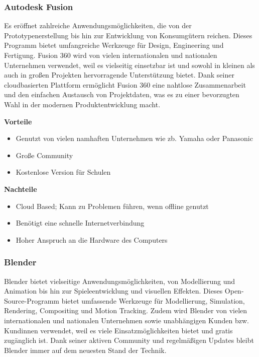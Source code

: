 \subsubsection{Autodesk Fusion}
Es eröffnet zahlreiche Anwendungsmöglichkeiten, die von der Prototypenerstellung bis hin zur Entwicklung von Konsumgütern reichen. Dieses Programm bietet umfangreiche Werkzeuge für Design, Engineering und Fertigung.  Fusion 360 wird von vielen internationalen und nationalen Unternehmen verwendet, weil es vielseitig einsetzbar ist und sowohl in kleinen als auch in großen Projekten hervorragende Unterstützung bietet. Dank seiner cloudbasierten Plattform ermöglicht Fusion 360 eine nahtlose Zusammenarbeit und den einfachen Austausch von Projektdaten, was es zu einer bevorzugten Wahl in der modernen Produktentwicklung macht. \\
\cite{AutodeskFusion}

\textbf{Vorteile}
\begin{itemize}
	\item Genutzt von vielen namhaften Unternehmen wie zb. Yamaha oder Panasonic
	\item Große Community
	\item Kostenlose Version für Schulen
\end{itemize} 

\textbf{Nachteile}
\begin{itemize}
	\item Cloud Based; Kann zu Problemen führen, wenn offline genutzt 
	\item Benötigt eine schnelle Internetverbindung
	\item Hoher Anspruch an die Hardware des Computers
\end{itemize}
\cite{AutodeskFusionReviews}


\subsubsection{Blender} 
Blender bietet vielseitige Anwendungsmöglichkeiten, von Modellierung und Animation bis hin zur Spieleentwicklung und visuellen Effekten. Dieses Open-Source-Programm bietet umfassende Werkzeuge für Modellierung, Simulation, Rendering, Compositing und Motion Tracking. Zudem wird Blender von vielen internationalen und nationalen Unternehmen sowie unabhängigen Kunden bzw. Kundinnen verwendet, weil es viele Einsatzmöglichkeiten bietet und gratis zugänglich ist. Dank seiner aktiven Community und regelmäßigen Updates bleibt Blender immer auf dem neuesten Stand der Technik. \\
\cite{Blender}

